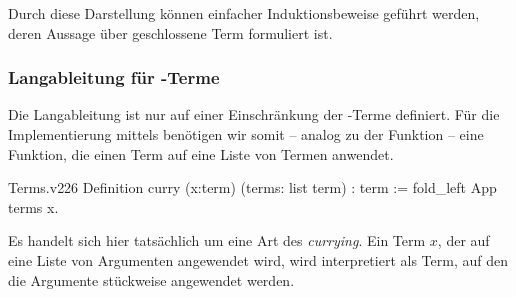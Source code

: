 Durch diese Darstellung können einfacher Induktionsbeweise geführt werden, deren Aussage über geschlossene Term formuliert ist.

\subsubsection{Langableitung für \tlambda-Terme}
Die Langableitung ist nur auf einer Einschränkung der \tlambda-Terme definiert. Für die Implementierung mittels  benötigen wir somit -- analog zu der Funktion  -- eine Funktion, die einen Term auf eine Liste von Termen anwendet.
\begin{code}[curry]{Terms.v}{}{226}
Definition curry (x:term) (terms: list term) : term :=
    fold_left App terms x.
\end{code}
\begin{remark}
    Es handelt sich hier tatsächlich um eine Art des \emph{currying}. Ein Term $x$, der auf eine Liste von Argumenten angewendet wird, wird interpretiert als Term, auf den die Argumente stückweise angewendet werden.        
\end{remark}

